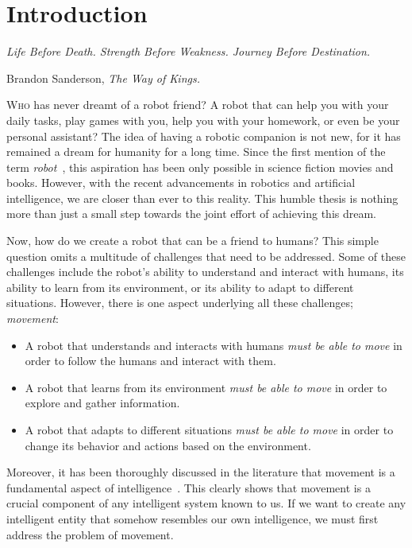 \usepackage{acronym}\chapter{Introduction}\label{ch:introduction}

\setlength{}
\epigraph{\itshape Life Before Death. Strength Before Weakness. Journey Before Destination.}{Brandon Sanderson, \textit{The Way of Kings.}}

\lettrine{\textcolor{accent_color}{W}}{ho} has never dreamt of a robot friend?
A robot that can help you with your daily tasks, play games with you, help you with your homework, or even be your personal assistant?
The idea of having a robotic companion is not new, for it has remained a dream for humanity for a long time.
Since the first mention of the term \textit{robot}~\cite{robot1920}, this aspiration has been only possible in science fiction movies and books.
However, with the recent advancements in robotics and artificial intelligence, we are closer than ever to this reality.
This humble thesis is nothing more than just a small step towards the joint effort of achieving this dream.

Now, how do we create a robot that can be a friend to humans?
This simple question omits a multitude of challenges that need to be addressed.
Some of these challenges include the robot's ability to understand and interact with humans, its ability to learn from its environment, or its ability to adapt to different situations.
However, there is one aspect underlying all these challenges; \textit{movement}:

\begin{itemize}
    \item A robot that understands and interacts with humans \textit{must be able to move} in order to follow the humans and interact with them.
    \item A robot that learns from its environment \textit{must be able to move} in order to explore and gather information.
    \item A robot that adapts to different situations \textit{must be able to move} in order to change its behavior and actions based on the environment.
\end{itemize}

Moreover, it has been thoroughly discussed in the literature that movement is a fundamental aspect of intelligence~\cite{Darwin1871, Arbib2005, Leisman2016, Wolpert2011, Llinas2001}.
This clearly shows that movement is a crucial component of any intelligent system known to us.
If we want to create any intelligent entity that somehow resembles our own intelligence, we must first address the problem of movement.

